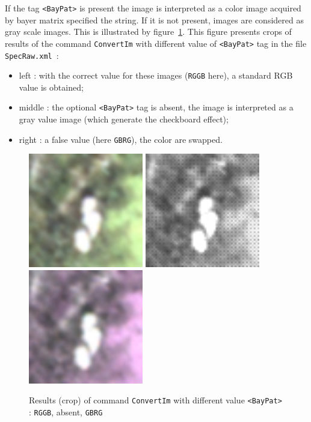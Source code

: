 If the tag {\tt <BayPat>} is present the image is interpreted as a color image acquired by bayer matrix
specified the string. If it is not present, images are considered  as gray scale images. This is
illustrated by figure~\ref{FIG:RawBayer}. This figure presents crops of results of the command
{\tt ConvertIm} with different value of {\tt <BayPat>} tag in the file {\tt  SpecRaw.xml}~:


\begin{itemize}
       \item left : with the correct value for these images ({\tt RGGB} here), a standard RGB value
	     is obtained;

       \item middle : the optional {\tt <BayPat>} tag is absent, the image is interpreted as a gray value
	     image (which generate the checkboard effect);

       \item right : a false value (here  {\tt GBRG}), the color are swapped.
\end{itemize}

\begin{figure}
\begin{center}
\includegraphics[width=50mm]{FIGS/RawImages/Coul.jpg}
\includegraphics[width=50mm]{FIGS/RawImages/Gray.jpg}
\includegraphics[width=50mm]{FIGS/RawImages/CoulBuged.jpg}
\end{center}
\caption{Results (crop) of command {\tt ConvertIm} with different value {\tt <BayPat>} : {\tt RGGB}, absent, {\tt GBRG}   }
\label{FIG:RawBayer}
\end{figure}


